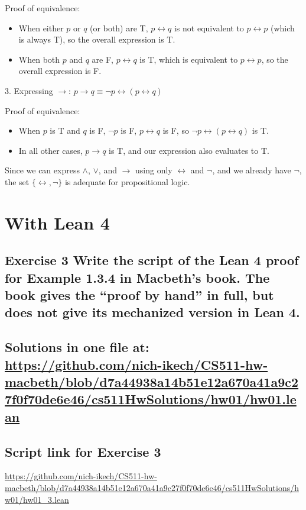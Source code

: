 \documentclass{article}
\begin{document}
   Proof of equivalence:
   \begin{itemize}
       \item When either $p$ or $q$ (or both) are T, $p \leftrightarrow q$ is not equivalent to $p \leftrightarrow p$ (which is always T), so the overall expression is T.
       \item When both $p$ and $q$ are F, $p \leftrightarrow q$ is T, which is equivalent to $p \leftrightarrow p$, so the overall expression is F.
   \end{itemize}

3. Expressing $\rightarrow$:
   $p \rightarrow q \equiv \neg p \leftrightarrow (p \leftrightarrow q)$
   
   Proof of equivalence:
   \begin{itemize}
       \item When $p$ is T and $q$ is F, $\neg p$ is F, $p \leftrightarrow q$ is F, so $\neg p \leftrightarrow (p \leftrightarrow q)$ is T.
       \item In all other cases, $p \rightarrow q$ is T, and our expression also evaluates to T.
   \end{itemize}

Since we can express $\wedge$, $\vee$, and $\rightarrow$ using only $\leftrightarrow$ and $\neg$, and we already have $\neg$, the set $\{\leftrightarrow, \neg\}$ is adequate for propositional logic.



\newpage
\section*{With Lean 4}


\subsection*{Exercise 3 Write the script of the Lean 4 proof for Example 1.3.4 in Macbeth’s book. The book
gives the “proof by hand” in full, but does not give its mechanized version in Lean 4.}

\subsection*{Solutions in one file at: \url{https://github.com/nich-ikech/CS511-hw-macbeth/blob/d7a44938a14b51e12a670a41a9c27f0f70de6e46/cs511HwSolutions/hw01/hw01.lean}}
\newpage
\subsection*{Script link for Exercise 3}
\url{https://github.com/nich-ikech/CS511-hw-macbeth/blob/d7a44938a14b51e12a670a41a9c27f0f70de6e46/cs511HwSolutions/hw01/hw01_3.lean}
\end{document}

